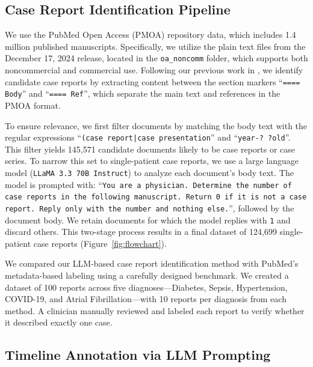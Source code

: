 \documentclass[pdflatex,sn-mathphys-num]{sn-jnl}%
\theoremstyle{thmstyleone}%
\theoremstyle{thmstyletwo}%
\theoremstyle{thmstylethree}%
\begin{document}
\subsection{Case Report Identification Pipeline}

We use the PubMed Open Access (PMOA) repository data, which includes 1.4 million published manuscripts. Specifically, we utilize the plain text files from the December 17, 2024 release, located in the \texttt{oa\_noncomm} folder, which supports both noncommercial and commercial use. Following our previous work in \cite{wang2025large}, we identify candidate case reports by extracting content between the section markers ``\texttt{==== Body}'' and ``\texttt{==== Ref}'', which separate the main text and references in the PMOA format.

To ensure relevance, we first filter documents by matching the body text with the regular expressions ``\texttt{(case report|case presentation}'' and ``\texttt{year-? ?old}''.
This filter yields 145,571 candidate documents likely to be case reports or case series. To narrow this set to single-patient case reports, we use a large language model (\texttt{LLaMA 3.3 70B Instruct}) to analyze each document's body text. The model is prompted with: ``\texttt{You are a physician. Determine the number of case reports in the following manuscript. Return 0 if it is not a case report. Reply only with the number and nothing else.}'', followed by the document body. We retain documents for which the model replies with \texttt{1} and discard others. This two-stage process results in a final dataset of 124,699 single-patient case reports (Figure~\ref{fig:flowchart}).

We compared our LLM-based case report identification method with PubMed's metadata-based labeling using a carefully designed benchmark. We created a dataset of 100 reports across five diagnoses—Diabetes, Sepsis, Hypertension, COVID-19, and Atrial Fibrillation—with 10 reports per diagnosis from each method. A clinician manually reviewed and labeled each report to verify whether it described exactly one case. 


\subsection{Timeline Annotation via LLM Prompting}
\end{document}
